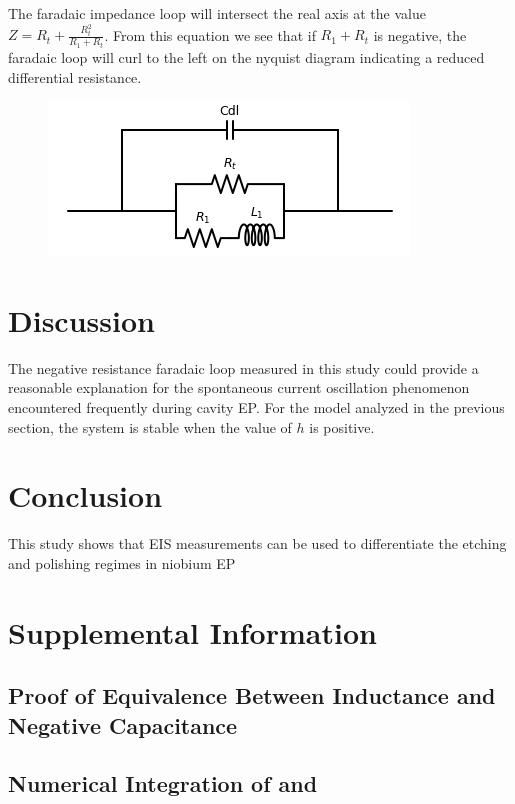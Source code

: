 \documentclass[11pt]{article}
\begin{document}
The faradaic impedance loop will intersect the real axis at the value $Z = R_t + \frac{R_t^2}{R_1+R_t}$. From this equation we see that if $R_1 + R_t$ is negative, the faradaic loop will curl to the left on the nyquist diagram indicating a reduced differential resistance.

\begin{figure}
  \label{fig:ec}
  \includegraphics[]{figures/ec.png}
  \caption{}
\end{figure}


\section*{Discussion}

The negative resistance faradaic loop measured in this study could provide a reasonable explanation for the spontaneous current oscillation phenomenon encountered frequently during cavity EP. For the model analyzed in the previous section, the system is stable when the value of $h$ is positive.


\section{Conclusion}
\label{sec:org57282ed}
This study shows that EIS measurements can be used to differentiate the etching and polishing regimes in niobium EP


\section{Supplemental Information}
\label{sec:org60214d3}


\subsection{Proof of Equivalence Between Inductance and Negative Capacitance}

\subsection{Numerical Integration of  and }
\label{sec:org84f1f26}
\end{document}

